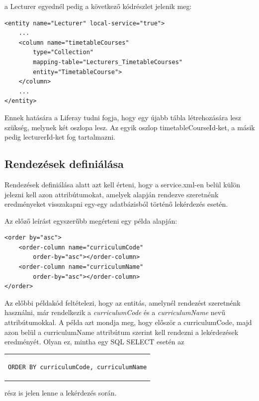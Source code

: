 \documentclass[hidelinks, 12pt, a4paper]{report}
\begin{document}
\noindent a Lecturer egyednél pedig a következő kódrészlet jelenik meg:

\begin{minipage}{\linewidth}
\begin{lstlisting}[basicstyle=\small]
<entity name="Lecturer" local-service="true">
	...
	<column name="timetableCourses"
		type="Collection"
		mapping-table="Lecturers_TimetableCourses"
		entity="TimetableCourse">
	</column>
	...
</entity>
\end{lstlisting}
\end{minipage}

\noindent Ennek hatására a Liferay tudni fogja, hogy egy újabb tábla létrehozására lesz szükség, melynek két oszlopa lesz. Az egyik oszlop timetableCourseId-ket, a másik pedig lecturerId-ket fog tartalmazni.

\subsection{Rendezések definiálása}

Rendezések definiálása alatt azt kell érteni, hogy a service.xml-en belül külön jelezni kell azon attribútumokat, amelyek alapján rendezve szeretnénk eredményeket visszakapni egy-egy adatbázisból történő lekérdezés esetén.

Az előző leírást egyszerűbb megérteni egy példa alapján:

\begin{minipage}{\linewidth}
\begin{lstlisting}
<order by="asc">
	<order-column name="curriculumCode"
		order-by="asc"></order-column>
	<order-column name="curriculumName"
		order-by="asc"></order-column>
</order>
\end{lstlisting}
\end{minipage}

Az előbbi példakód feltételezi, hogy az entitás, amelynél rendezést szeretnénk használni, már rendelkezik a \emph{curriculumCode} és a \emph{curriculumName} nevű attribútumokkal. A példa azt mondja meg, hogy először a curriculumCode, majd azon belül a curriculumName attribútum szerint kell rendezni a lekérdezések eredményét. Olyan ez, mintha egy SQL SELECT esetén az
\begin{center}
\begin{tabular}{c}
\begin{lstlisting}
ORDER BY curriculumCode, curriculumName
\end{lstlisting}
\end{tabular}
\end{center}
rész is jelen lenne a lekérdezés során.
\end{document}
